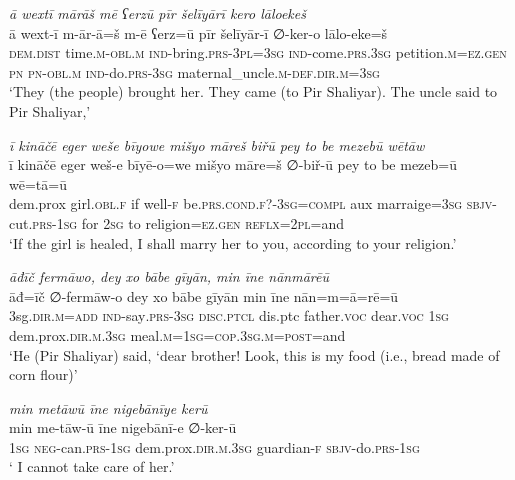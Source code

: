 \ea \label{ZP.97}
\textit{ā wextī mārāš mē ʕerzū pīr šelīyārī kero lāloekeš} \\ 
\gll ā wext-ī m-ār-ā=š m-ē ʕerz=ū pīr šelīyār-ī ∅-ker-o lālo-eke=š \\ 
 \textsc{dem.dist} time\textsc{.m}\textsc{-obl}\textsc{.m} \textsc{ind-}bring\textsc{.prs}\textsc{-3pl}\textsc{=3sg} \textsc{ind-}come\textsc{.prs}\textsc{.3sg} petition\textsc{.m}\textsc{\textsc{=ez.gen}} \textsc{pn} \textsc{pn}\textsc{-obl}\textsc{.m} \textsc{ind-}do\textsc{.prs}\textsc{-3sg} maternal\_uncle\textsc{.m}\textsc{-def}\textsc{.dir}\textsc{.m}\textsc{=3sg} \\ 
\glt `They (the people) brought her. They came (to Pir Shaliyar). The uncle said to Pir Shaliyar,'
\z 
 
\ea \label{ZP.100}
\textit{ī kināčē eger weše bīyowe mišyo māreš biřū pey to be mezebū wētāw} \\ 
\gll ī kināčē eger weš-e bīyē-o=we mišyo māre=š ∅-biř-ū pey to be mezeb=ū wē=tā=ū \\ 
 dem.prox girl\textsc{.obl}\textsc{.f} if well\textsc{-f} be\textsc{.prs}.\textsc{cond}\textsc{.f}?\textsc{-3sg}\textsc{=compl} aux marraige\textsc{=3sg} \textsc{sbjv-}cut\textsc{.prs}\textsc{-\textsc{1sg}} for \textsc{2sg} to religion\textsc{\textsc{=ez.gen}} \textsc{reflx}=\textsc{2pl}=and \\ 
\glt `If the girl is healed, I shall marry her to you, according to your religion.'
\z 
 
\ea \label{ZP.101}
\textit{āđīč fermāwo, dey xo bābe gīyān, min īne nānmārēū} \\ 
\gll āđ=īč ∅-fermāw-o dey xo bābe gīyān min īne nān=m=ā=rē=ū \\ 
 3sg\textsc{.dir}\textsc{.m}\textsc{=add} \textsc{ind-}say\textsc{.prs}\textsc{-3sg} \textsc{disc.ptcl} dis.ptc father.\textsc{voc} dear.\textsc{voc} \textsc{1sg} dem.prox\textsc{.dir}\textsc{.m}\textsc{.3sg} meal\textsc{.m}\textsc{=\textsc{1sg}}\textsc{=cop}\textsc{.3sg}\textsc{.m}\textsc{=\textsc{post}}=and \\ 
\glt `He (Pir Shaliyar) said, ‘dear brother! Look, this is my food (i.e., bread made of corn flour)'
\z 
 
\ea \label{ZP.103}
\textit{min metāwū īne nigebānīye kerū} \\ 
\gll min me-tāw-ū īne nigebānī-e ∅-ker-ū \\ 
 \textsc{1sg} \textsc{neg-}can\textsc{.prs}\textsc{-\textsc{1sg}} dem.prox\textsc{.dir}\textsc{.m}\textsc{.3sg} guardian\textsc{-f} \textsc{sbjv-}do\textsc{.prs}\textsc{-\textsc{1sg}} \\ 
\glt ` I cannot take care of her.'
\z 
 

